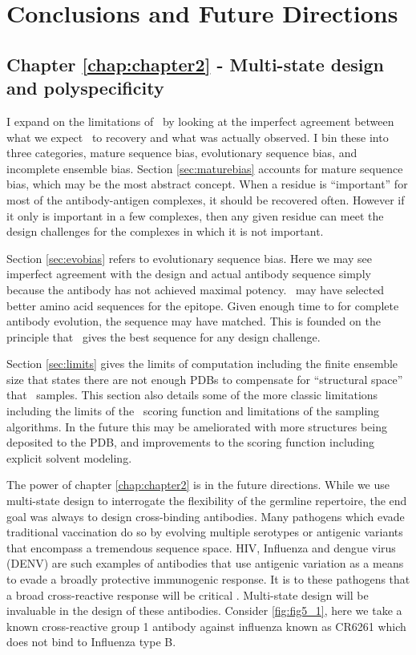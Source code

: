 \chapter{Conclusions and Future Directions}
\label{chap:chapter5}
\section{Chapter \ref{chap:chapter2} - Multi-state design and polyspecificity}
I expand on the limitations of \rosettadesign~by looking at the imperfect agreement between what we expect \rosettadesign~to recovery and what was actually observed. I bin these into three categories, mature sequence bias, evolutionary sequence bias, and incomplete ensemble bias. Section \ref{sec:maturebias} accounts for mature sequence bias, which may be the most abstract concept. When a residue is ``important'' for most of the antibody-antigen complexes, it should be recovered often. However if it only is important in a few complexes, then any given residue can meet the design challenges for the complexes in which it is not important.

Section \ref{sec:evobias} refers to evolutionary sequence bias. Here we may see imperfect agreement with the design and actual antibody sequence simply because the antibody has not achieved maximal potency. \rosettadesign~may have selected better amino acid sequences for the epitope. Given enough time to for complete antibody evolution, the sequence may have matched. This is founded on the principle that \rosettadesign~gives the best sequence for any design challenge.

Section \ref{sec:limits} gives the limits of computation including the finite ensemble size that states there are not enough PDBs to compensate for ``structural space'' that \rosettadesign~samples. This section also details some of the more classic limitations including the limits of the \rosetta~scoring function and limitations of the sampling algorithms. In the future this may be ameliorated with more structures being deposited to the PDB, and improvements to the scoring function including explicit solvent modeling.

The power of chapter \ref{chap:chapter2} is in the future directions. While we use multi-state design to interrogate the flexibility of the germline repertoire, the end goal was always to design cross-binding antibodies. Many pathogens which evade traditional vaccination do so by evolving multiple serotypes or antigenic variants that encompass a tremendous sequence space. HIV, Influenza and dengue virus (DENV) are such examples of antibodies that use antigenic variation as a means to evade a broadly protective immunogenic response. It is to these pathogens that a broad cross-reactive response will be critical \citep{Corti:2013ex,Lanzavecchia:2009dd,Corti:2011ku,Simonelli:2013jc}. Multi-state design will be invaluable in the design of these antibodies. Consider \ref{fig:fig5_1}, here we take a known cross-reactive group 1 antibody against influenza known as CR6261 \citep{Throsby:2008dc} which does not bind to Influenza type B.

